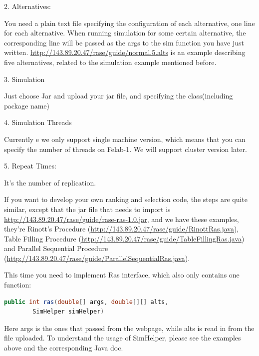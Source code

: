\documentclass[12pt,a4paper]{report}
\begin{document}
2.	Alternatives:

You need a plain text file specifying the configuration of each alternative, one line for each alternative. When running simulation for some certain alternative, the corresponding line will be passed as the args to the sim function you have just written. \url{http://143.89.20.47/rase/guide/normal.5.alts} is an example describing five alternatives, related to the simulation example mentioned before.

3.	Simulation

Just choose Jar and upload your jar file, and specifying the class(including package name)

4.	Simulation Threads

Currently e we only support single machine version, which means that you can specify the number of threads on Felab-1. We will support cluster version later.

5.	Repeat Times:

It’s the number of replication.

If you want to develop your own ranking and selection code, the steps are quite similar, except that the jar file that needs to import is \url{http://143.89.20.47/rase/guide/rase-ras-1.0.jar}, and we have these examples, they’re Rinott’s Procedure (\url{http://143.89.20.47/rase/guide/RinottRas.java}), Table Filling Procedure (\url{http://143.89.20.47/rase/guide/TableFillingRas.java}) and Parallel Sequential Procedure (\url{http://143.89.20.47/rase/guide/ParallelSequentialRas.java}).

This time you need to implement Ras interface, which also only contains one function:

\begin{lstlisting}[language=Java]
public int ras(double[] args, double[][] alts,
        SimHelper simHelper)
\end{lstlisting}

Here args is the ones that passed from the webpage, while alts is read in from the file uploaded. To understand the usage of SimHelper, please see the examples above and the corresponding Java doc.

\newpage
%

%
\end{document}
